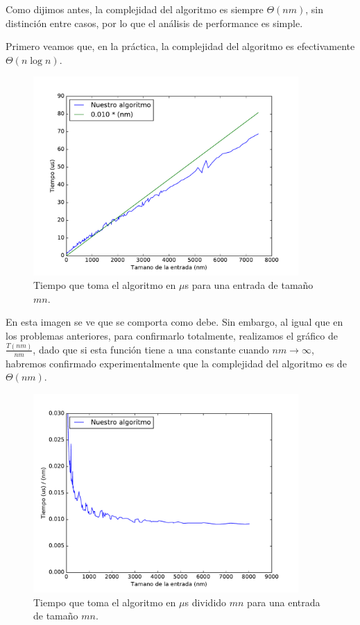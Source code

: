 

Como dijimos antes, la complejidad del algoritmo es siempre $\Theta(n m)$, sin distinción entre casos, por lo que el análisis de performance es simple.

Primero veamos que, en la práctica, la complejidad del algoritmo es efectivamente $\Theta(n \log n)$.

\begin{figure}[H]
 \centering
	\includegraphics[width=0.9\textwidth]{img/exp/problema3-promedio.pdf}
	\caption{\footnotesize Tiempo que toma el algoritmo en $\mu$s para una entrada de tamaño $mn$.}
	\label{fig:problema3-promedio}
\end{figure}

En esta imagen se ve que se comporta como debe. Sin embargo, al igual que en los problemas anteriores, para confirmarlo totalmente, realizamos el gráfico de $\frac{T(nm)}{nm}$, dado que si esta función tiene a una constante cuando $nm \to \infty$, habremos confirmado experimentalmente que la complejidad del algoritmo es de $\Theta(n m)$.

\begin{figure}[H]
 \centering
	\includegraphics[width=0.9\textwidth]{img/exp/problema3-promedio2.pdf}
	\caption{\footnotesize Tiempo que toma el algoritmo en $\mu$s dividido $mn$ para una entrada de tamaño $mn$.}
	\label{fig:problema3-promedio2}
\end{figure}


